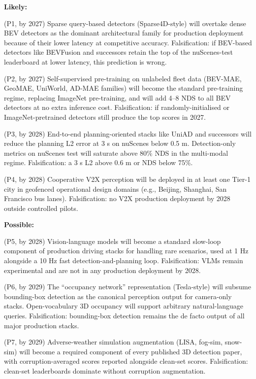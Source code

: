 \textbf{Likely:}

(P1, by 2027) Sparse query-based detectors (Sparse4D-style) will overtake dense BEV detectors as the dominant architectural family for production deployment because of their lower latency at competitive accuracy. Falsification: if BEV-based detectors like BEVFusion and successors retain the top of the nuScenes-test leaderboard at lower latency, this prediction is wrong.

(P2, by 2027) Self-supervised pre-training on unlabeled fleet data (BEV-MAE, GeoMAE, UniWorld, AD-MAE families) will become the standard pre-training regime, replacing ImageNet pre-training, and will add 4--8 NDS to all BEV detectors at no extra inference cost. Falsification: if randomly-initialised or ImageNet-pretrained detectors still produce the top scores in 2027.

(P3, by 2028) End-to-end planning-oriented stacks like UniAD and successors will reduce the planning L2 error at 3 s on nuScenes below 0.5 m. Detection-only metrics on nuScenes test will saturate above 80\% NDS in the multi-modal regime. Falsification: a 3 s L2 above 0.6 m or NDS below 75\%.

(P4, by 2028) Cooperative V2X perception will be deployed in at least one Tier-1 city in geofenced operational design domains (e.g., Beijing, Shanghai, San Francisco bus lanes). Falsification: no V2X production deployment by 2028 outside controlled pilots.

\textbf{Possible:}

(P5, by 2028) Vision-language models will become a standard slow-loop component of production driving stacks for handling rare scenarios, used at 1 Hz alongside a 10 Hz fast detection-and-planning loop. Falsification: VLMs remain experimental and are not in any production deployment by 2028.

(P6, by 2029) The ``occupancy network'' representation (Tesla-style) will subsume bounding-box detection as the canonical perception output for camera-only stacks. Open-vocabulary 3D occupancy will support arbitrary natural-language queries. Falsification: bounding-box detection remains the de facto output of all major production stacks.

(P7, by 2029) Adverse-weather simulation augmentation (LISA, fog-sim, snow-sim) will become a required component of every published 3D detection paper, with corruption-averaged scores reported alongside clean-set scores. Falsification: clean-set leaderboards dominate without corruption augmentation.

